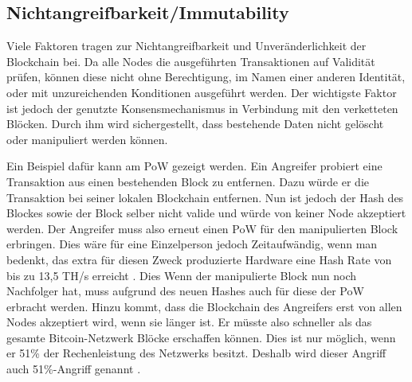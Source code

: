 
\subsection{Nichtangreifbarkeit/Immutability}
\label{subsec:immutability}
Viele Faktoren tragen zur Nichtangreifbarkeit und Unveränderlichkeit der Blockchain bei. Da alle Nodes die ausgeführten Transaktionen auf Validität prüfen, können diese nicht ohne Berechtigung, im Namen einer anderen Identität, oder mit unzureichenden Konditionen ausgeführt werden. Der wichtigste Faktor ist jedoch der genutzte Konsensmechanismus in Verbindung mit den verketteten Blöcken. Durch ihm wird sichergestellt, dass bestehende Daten nicht gelöscht oder manipuliert werden können.

Ein Beispiel dafür kann am PoW gezeigt werden. Ein Angreifer probiert eine Transaktion aus einen bestehenden Block zu entfernen. Dazu würde er die Transaktion bei seiner lokalen Blockchain entfernen. Nun ist jedoch der Hash des Blockes sowie der Block selber nicht valide und würde von keiner Node akzeptiert werden. Der Angreifer muss also erneut einen PoW für den manipulierten Block erbringen. Dies wäre für eine Einzelperson jedoch Zeitaufwändig, wenn man bedenkt, das extra für diesen Zweck produzierte Hardware eine Hash Rate von bis zu 13,5 TH/s erreicht \cite{BitcoinminingLearnBitcoinmining}. Dies  Wenn der manipulierte Block nun noch Nachfolger hat, muss aufgrund des neuen Hashes auch für diese der PoW erbracht werden. Hinzu kommt, dass die Blockchain des Angreifers erst von allen Nodes akzeptiert wird, wenn sie länger ist. Er müsste also schneller als das gesamte Bitcoin-Netzwerk Blöcke erschaffen können.  Dies ist nur möglich, wenn er 51\% der Rechenleistung des Netzwerks besitzt. Deshalb wird dieser Angriff auch 51\%-Angriff genannt \cite{SwanBlockchainblueprintnew2015} \cite{EthereumTeamEthereumWhitePaper2017}.

